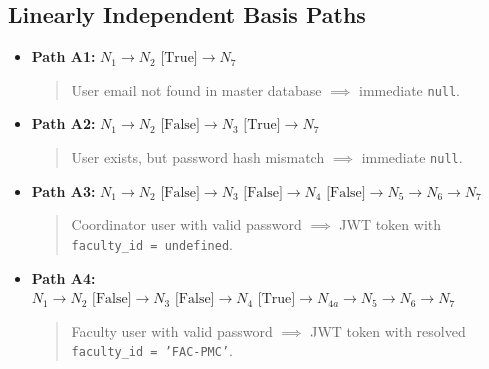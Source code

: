\documentclass[11pt,a4paper]{article}
\begin{document}
\subsection{Linearly Independent Basis Paths}
\begin{itemize}
    \item \textbf{Path A1:} $N_1 \to N_2 \text{ [True]} \to N_7$
    \begin{quote}User email not found in master database $\implies$ immediate \texttt{null}.\end{quote}
    \item \textbf{Path A2:} $N_1 \to N_2 \text{ [False]} \to N_3 \text{ [True]} \to N_7$
    \begin{quote}User exists, but password hash mismatch $\implies$ immediate \texttt{null}.\end{quote}
    \item \textbf{Path A3:} $N_1 \to N_2 \text{ [False]} \to N_3 \text{ [False]} \to N_4 \text{ [False]} \to N_5 \to N_6 \to N_7$
    \begin{quote}Coordinator user with valid password $\implies$ JWT token with \texttt{faculty\_id = undefined}.\end{quote}
    \item \textbf{Path A4:} $N_1 \to N_2 \text{ [False]} \to N_3 \text{ [False]} \to N_4 \text{ [True]} \to N_{4a} \to N_5 \to N_6 \to N_7$
    \begin{quote}Faculty user with valid password $\implies$ JWT token with resolved \texttt{faculty\_id = 'FAC-PMC'}.\end{quote}
\end{itemize}
\end{document}
